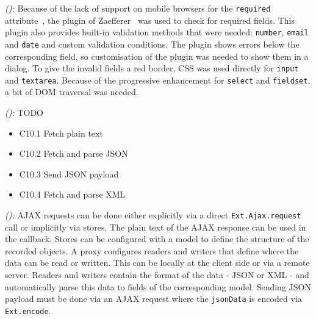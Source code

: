 \documentclass[a4paper]{artikel3}
\newcommand{\code}[1]{\texttt{#1}}
\newcommand{\setspace}[0]{\vspace{2mm}}
\renewcommand{\paragraph}[1]{\setspace \noindent {\bf #1}  }
\newcommand{\framework}[2]{ \emph{#1 (\textbf{#2}): }} %
\newcommand{\challenge}[1]{\paragraph{#1}}
\begin{document}
\framework{\jqma{}}{}
Because of the lack of support on mobile browsers for the \code{required} attribute~\cite{Deveria2013}, the plugin of Zaefferer~\cite{Zaefferer2013} was used to check for required fields.
This plugin also provides built-in validation methods that were needed: \code{number}, \code{email} and \code{date} and custom validation conditions.
The plugin shows errors below the corresponding field, so customisation of the plugin was needed to show them in a dialog.
To give the invalid fields a red border, CSS was used directly for \code{input} and \code{textarea}.
Because of the progressive enhancement for \code{select} and \code{fieldset}, a bit of DOM traversal was needed.

\framework{\lungoa{}}{}
TODO


% 
% 


\challenge{\chal{ajax}}
\begin{itemize}
  \item C10.1 Fetch plain text
  \item C10.2 Fetch and parse JSON
  \item C10.3 Send JSON payload
  \item C10.4 Fetch and parse XML
\end{itemize}

\framework{\sta{}}{}
AJAX requests can be done either explicitly via a direct \code{Ext.Ajax.request} call or implicitly via stores.  
The plain text of the AJAX response can be used in the callback.   
Stores can be configured with a model to define the structure of the recorded objects.  
A proxy configures readers and writers that define where the data can be read or written.  
This can be locally at the client side or via a remote server.  
Readers and writers contain the format of the data - JSON or XML - and automatically parse this data to fields of the corresponding model. 
Sending JSON payload must be done via an AJAX request where the \code{jsonData} is encoded via \code{Ext.encode}.
\end{document}
